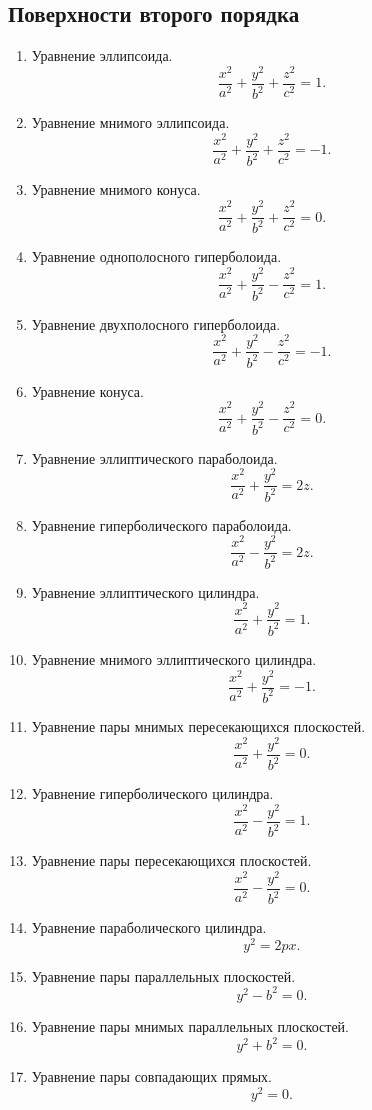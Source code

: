 \documentclass[12pt]{report}
\theoremstyle{definition}
\begin{document}
\subsection{Поверхности второго порядка}
\begin{enumerate}
\item Уравнение эллипсоида.
  $$
    \dfrac{x^2}{a^2} + \dfrac{y^2}{b^2} + \dfrac{z^2}{c^2} = 1.
  $$

\item Уравнение мнимого эллипсоида.
  $$
    \dfrac{x^2}{a^2} + \dfrac{y^2}{b^2} + \dfrac{z^2}{c^2} = -1.
  $$

\item Уравнение мнимого конуса.
  $$
    \dfrac{x^2}{a^2} + \dfrac{y^2}{b^2} + \dfrac{z^2}{c^2} = 0.
  $$

\item Уравнение однополосного гиперболоида.
  $$
    \dfrac{x^2}{a^2} + \dfrac{y^2}{b^2} - \dfrac{z^2}{c^2} = 1.
  $$
\item Уравнение двухполосного гиперболоида.
  $$
    \dfrac{x^2}{a^2} + \dfrac{y^2}{b^2} - \dfrac{z^2}{c^2} = -1.
  $$

\item Уравнение конуса.
  $$
    \dfrac{x^2}{a^2} + \dfrac{y^2}{b^2} - \dfrac{z^2}{c^2} = 0.
  $$

\item Уравнение эллиптического параболоида.
  $$
    \dfrac{x^2}{a^2} + \dfrac{y^2}{b^2} = 2 z.
  $$

\item Уравнение гиперболического параболоида.
  $$
    \dfrac{x^2}{a^2} - \dfrac{y^2}{b^2} = 2 z.
  $$

\item Уравнение эллиптического цилиндра.
  $$
    \dfrac{x^2}{a^2} + \dfrac{y^2}{b^2} = 1.
  $$

\item Уравнение мнимого эллиптического цилиндра.
  $$
    \dfrac{x^2}{a^2} + \dfrac{y^2}{b^2} = -1.
  $$

\item Уравнение пары мнимых пересекающихся плоскостей.
  $$
     \dfrac{x^2}{a^2} + \dfrac{y^2}{b^2} = 0.
  $$

\item Уравнение гиперболического цилиндра.
  $$
    \dfrac{x^2}{a^2} - \dfrac{y^2}{b^2} = 1.
  $$

\item Уравнение пары пересекающихся плоскостей.
  $$
     \dfrac{x^2}{a^2} - \dfrac{y^2}{b^2} = 0.
  $$

\item Уравнение параболического цилиндра.
  $$
    y^2 = 2 p x.
  $$

\item Уравнение пары параллельных плоскостей.
  $$
    y^2 - b^2 = 0.
  $$

\item Уравнение пары мнимых параллельных плоскостей.
  $$
    y^2 + b^2 = 0.
  $$

\item Уравнение пары совпадающих прямых.
  $$
    y^2 = 0.
  $$

\end{enumerate}
\end{document}
